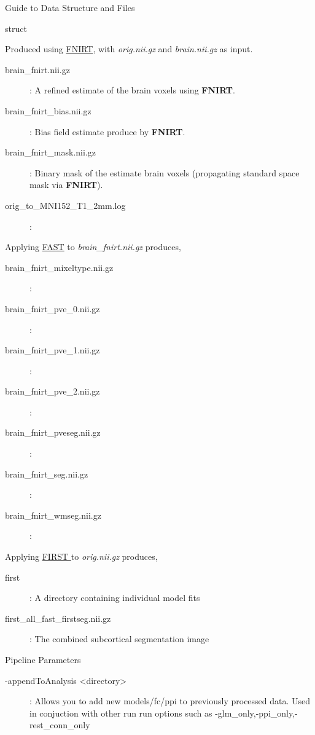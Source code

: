 \documentclass[]{report}
\begin{document}
\begin{chapter}{Guide to Data Structure and Files}
\begin{section}{struct}
\begin{description}
	Produced using  \href{http://fsl.fmrib.ox.ac.uk/fsl/fslwiki/FNIRT}{\color{blue} FNIRT}, with {\it orig.nii.gz} and {\it brain.nii.gz} as input.
	\begin{description}
		\item[brain\_fnirt.nii.gz] : A refined estimate of the brain voxels using {\bf FNIRT}.
		\item[brain\_fnirt\_bias.nii.gz] : Bias field estimate produce by  {\bf FNIRT}.
		\item[brain\_fnirt\_mask.nii.gz] : Binary mask of the estimate brain voxels (propagating standard space mask via {\bf FNIRT}).
		\item[orig\_to\_MNI152\_T1\_2mm.log] :
	\end{description}

	Applying  \href{http://fsl.fmrib.ox.ac.uk/fsl/fslwiki/FAST}{\color{blue} FAST} to  {\it brain\_fnirt.nii.gz} produces, 
	\begin{description}
		\item[brain\_fnirt\_mixeltype.nii.gz] :
		\item[brain\_fnirt\_pve\_0.nii.gz] :
		\item[brain\_fnirt\_pve\_1.nii.gz] :
		\item[brain\_fnirt\_pve\_2.nii.gz] :
		\item[brain\_fnirt\_pveseg.nii.gz] :
		\item[brain\_fnirt\_seg.nii.gz] :
		\item[brain\_fnirt\_wmseg.nii.gz] :
	\end{description}

	Applying \href{http://fsl.fmrib.ox.ac.uk/fsl/fsl-4.1.9/first/index.html}{\color{blue} FIRST } to  {\it orig.nii.gz} produces, 
	\begin{description}
	\item[first] : A directory containing individual model fits 
	\item[first\_all\_fast\_firstseg.nii.gz] : The combined subcortical segmentation image
		\end{description}
		\end{description}

\end{section}

\end{chapter}

\begin{chapter}{Pipeline Parameters}
		\begin{description}
			\item[-appendToAnalysis <directory> ] : Allows you to add new models/fc/ppi to previously processed data. Used in conjuction with other run run options such as -glm\_only,-ppi\_only,-rest\_conn\_only
		\end{description}


\end{chapter}
\end{document}

